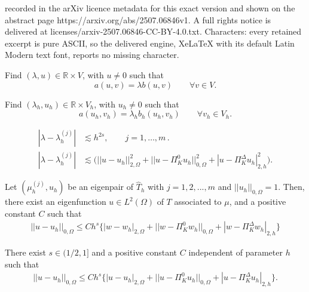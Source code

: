 \documentclass[10pt,a4paper]{amsart}
\def\LO{L^2(\O)}
\def\O{\Omega}
\def\PiK{\Pi_{K}^{\Delta}}
\def\l{\lambda}
\begin{document}
recorded in the arXiv licence metadata for this exact version and shown on the abstract page https://arxiv.org/abs/2507.06846v1. A full rights notice is delivered at licenses/arxiv-2507.06846-CC-BY-4.0.txt. Characters: every retained excerpt is pure ASCII, so the delivered engine, XeLaTeX with its default Latin Modern text font, reports no missing character.
\begin{problem}\label{WMPr} 
Find $(\lambda,u)\in \mathbb{R}\times V$, with $u\neq 0$ such that
\begin{equation*}
    a(u,v)=\lambda b(u,v)\qquad \forall v\in V.
\end{equation*}
\end{problem}

\begin{problem}\label{DiscVP}
Find $(\lambda_h,u_h)\in \mathbb{R}\times V_h$, with $u_h\neq 0$ such that
\begin{equation*}
    a(u_h,v_h)=\lambda_h b_h(u_h,v_h)\qquad \forall v_h\in V_h.
\end{equation*}
\end{problem} 

\begin{align}
\left|\l-\l_h^{(j)}\right|&\lesssim  h^{2s},\qquad j=1,\ldots,m\,.\label{double_conv_1}\\[1ex]
\left|\l-\l_h^{(j)}\right|&\lesssim \Big( ||u-u_h||_{2,\Omega}^2 + ||u-\Pi_K^0 u_h||_{0,\Omega}^2 + |u- \PiK u_h|_{2,h}^2 \Big)\label{double_conv_2}.
\end{align}

\begin{lemma}\label{Lema4.12} Let $(\mu_h^{(j)},u_h)$ be an eigenpair of $\widehat{T}_h$  with $j=1,2,...,m$ and $||u_h ||_{0,\O}=1$. Then, there exist an eigenfunction $u\in \LO$ of $T$ associated to $\mu$, and a positive constant $C$ such that
\begin{align}
||u-u_h ||_{0,\O}\leq  Ch^s\Big\{|w-w_h|_{2,\O}+||w-\Pi_K^0 w_h ||_{0,\Omega}+|w-\PiK  w_h|_{2,h}\Big\} \label{aux_pre_th}
\end{align}  
\end{lemma}

\begin{theorem}\label{Teor4.9}
There exist $s\in(1/2,1]$ and a positive constant $C$ independent of parameter $h$ such that
\begin{align*}
||u-u_h ||_{0,\O}\leq Ch^s\Big\{|u-u_h|_{2,\O}+||u-\Pi_K^0 u_h ||_{0,\Omega}+|u-\PiK  u_h|_{2,h}\Big\}.
\end{align*}
\end{theorem}
\end{document}
